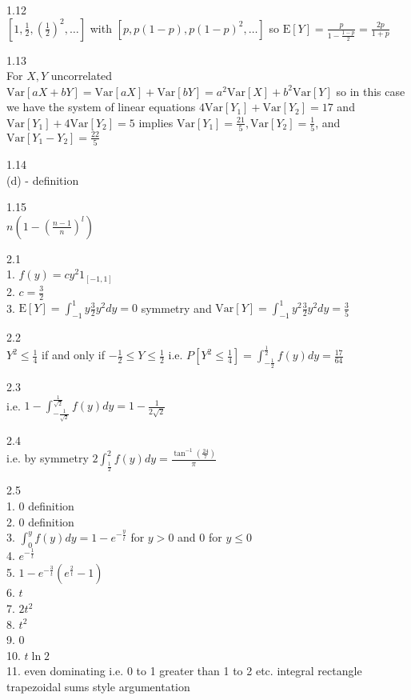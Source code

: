 1.12 \\
$\left[ 1,\frac{1}{2},\left( \frac{1}{2} \right)^2,\dots \right]$ with $\left[p,p(1-p),p(1-p)^2,\dots \right]$ so $\text{E}[Y]=\frac{p}{1-\frac{1-p}{2}}=\frac{2p}{1+p}$

1.13 \\
For $X,Y$ uncorrelated $\text{Var}[aX+bY]=\text{Var}[aX]+\text{Var}[bY]=a^2 \text{Var}[X]+b^2 \text{Var}[Y]$ so in this case we have the system of linear equations $4 \text{Var}[Y_1]+ \text{Var}[Y_2]=17$ and $\text{Var}[Y_1]+4 \text{Var}[Y_2]=5$ implies $\text{Var}[Y_1]=\frac{21}{5},\text{Var}[Y_2]=\frac{1}{5}$, and $\text{Var}[Y_1-Y_2]=\frac{22}{5}$

1.14 \\
(d) - definition

1.15 \\
$n\left( 1-\left( \frac{n-1}{n} \right)^l \right)$

\newpage

2.1 \\
1. $f(y)=cy^2 1_{[-1,1]}$ \\
2. $c=\frac{3}{2}$ \\
3. $\text{E}[Y]=\int_{-1}^1 y\frac{3}{2}y^2dy=0$ symmetry and $\text{Var}[Y]=\int_{-1}^1 y^2\frac{3}{2}y^2dy=\frac{3}{5}$

2.2 \\
$Y^2\le\frac{1}{4}$ if and only if $-\frac{1}{2}\le Y \le \frac{1}{2}$ i.e. $P[Y^2\le \frac{1}{4}]=\int_{-\frac{1}{2}}^{\frac{1}{2}}f(y)dy=\frac{17}{64}$

2.3 \\
i.e. $1-\int_{-\frac{1}{\sqrt{2}}}^{\frac{1}{\sqrt{2}}}f(y)dy=1-\frac{1}{2\sqrt{2}}$

2.4 \\
i.e. by symmetry $2\int_{\frac{1}{2}}^{2} f(y)dy=\frac{\tan^{-1}(\frac{24}{7})}{\pi}$

2.5 \\
1. $0$ definition\\
2. $0$ definition\\
3. $\int_0^y f(y)dy=1-e^{-\frac{y}{t}}$ for $y>0$ and $0$ for $y\le 0$\\
4. $e^{-\frac{1}{t}}$\\
5. $1-e^{-\frac{3}{t}}(e^{\frac{2}{t}}-1)$\\
6. $t$\\
7. $2t^2$\\
8. $t^2$\\
9. $0$\\
10. $t\ln{2}$\\
11. even dominating i.e. 0 to 1 greater than 1 to 2 etc. integral rectangle trapezoidal sums style argumentation

